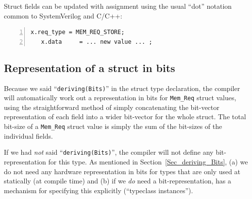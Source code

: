 Struct fields can be updated with assignment using the usual ``dot''
notation common to SystemVerilog and C/C++:

{\footnotesize
\begin{Verbatim}[frame=single, numbers=left]
   x.req_type = MEM_REQ_STORE;
   x.data     = ... new value ... ;
\end{Verbatim}
}


\subsection{Representation of a struct in bits}

\label{Sec_struct_representation}


Because we said ``\verb|deriving(Bits)|'' in the struct type
declaration, the {\bsc} compiler will automatically work out a
representation in bits for \verb|Mem_Req| struct values, using the
straightforward method of simply concatenating the bit-vector
representation of each field into a wider bit-vector for the whole
struct.  The total bit-size of a \verb|Mem_Req| struct value is simply
the sum of the bit-sizes of the individual fields.

If we had \emph{not} said ``\verb|deriving(Bits)|'', the {\bsc}
compiler will not define any bit-representation for this type.  As
mentioned in Section~\ref{Sec_deriving_Bits}, (a) we do not need any
hardware representation in bits for types that are only used at
statically (at compile time) and (b) if we \emph{do} need a
bit-representation, {\BSV} has a mechanism for specifying this
explicitly (``typeclass instances'').

\vspace{2ex}

